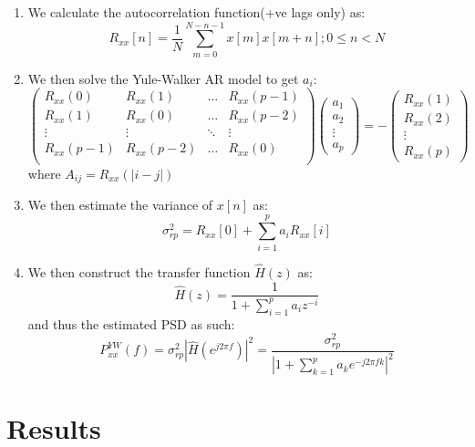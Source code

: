\documentclass{article}
\begin{document}
\begin{enumerate}
  \item We calculate the autocorrelation function(+ve lags only) as:
    \begin{equation}
      R_{xx}[n]=\frac{1}{N}\sum_{m=0}^{N-n-1}x[m]x[m+n]; 0\leq n<N
    \end{equation}
  \item We then solve the Yule-Walker AR model to get $a_i$:
    \begin{equation}
    \begin{pmatrix}
      R_{xx}(0) & R_{xx}(1)  & \ldots & R_{xx}(p-1)\\
      R_{xx}(1) & R_{xx}(0)  & \ldots & R_{xx}(p-2)\\
      \vdots & \vdots & \ddots & \vdots\\
      R_{xx}(p-1) & R_{xx}(p-2) & \ldots & R_{xx}(0)\\
    \end{pmatrix}
    \begin{pmatrix}
      a_1\\
      a_2\\
      \vdots\\
      a_p
    \end{pmatrix}
    =-
    \begin{pmatrix}
      R_{xx}(1)\\
      R_{xx}(2)\\
      \vdots\\
      R_{xx}(p)
    \end{pmatrix}
    \end{equation}
    where $A_{ij}=R_{xx}(|i-j|)$
  \item We then estimate the variance of $x[n]$ as:
    \begin{equation}
      \sigma^2_{rp}=R_{xx}[0]+\sum_{i=1}^{p}a_i R_{xx}[i]
    \end{equation}
  \item We then construct the transfer function $\hat{H}(z)$ as:
    \begin{equation}
      \hat{H}(z)=\frac{1}{1+\sum_{i=1}^{p}a_i z^{-i}}
    \end{equation}
    and thus the estimated PSD as such:
    \begin{equation}
      P^{YW}_{xx}(f)=\sigma^2_{rp}|\hat{H}(e^{j2\pi f})|^2=\frac{\sigma^2_{rp}}{|1+\sum_{k=1}^{p}a_k e^{-j2\pi fk}|^2}
    \end{equation}
\end{enumerate}
\clearpage
\section{Results}
\end{document}
